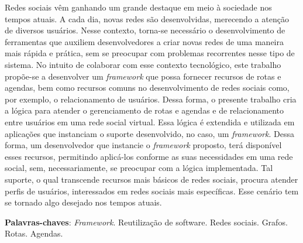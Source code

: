 \begin{resumo}

Redes sociais vêm ganhando um grande destaque em meio à sociedade nos tempos atuais. A cada dia, novas redes são desenvolvidas, merecendo a atenção de diversos usuários. Nesse contexto, torna-se necessário o desenvolvimento de ferramentas que auxiliem desenvolvedores a criar novas redes de uma maneira mais rápida e prática, sem se preocupar com problemas recorrentes nesse tipo de sistema. No intuito de colaborar com esse contexto tecnológico, este trabalho propõe-se a desenvolver um \textit{framework} que possa fornecer recursos de rotas e agendas, bem como recursos comuns no desenvolvimento de redes sociais como, por exemplo, o relacionamento de usuários. Dessa forma, o presente trabalho cria a lógica para atender o gerenciamento de rotas e agendas e de relacionamento entre usuários em uma rede social virtual. Essa lógica é extendida e utilizada em aplicações que instanciam o suporte desenvolvido, no caso, um \textit{framework}. Dessa forma, um desenvolvedor que instancie o \textit{framework} proposto, terá disponível esses recursos, permitindo aplicá-los conforme as suas necessidades em uma rede social, sem, necessariamente, se preocupar com a lógica implementada. Tal suporte, o qual transcende recursos mais básicos de redes sociais, procura atender perfis de usuários, interessados em redes sociais mais específicas. Esse cenário tem se tornado algo desejado nos tempos atuais.

 \vspace{\onelineskip}
    
 \noindent
 \textbf{Palavras-chaves}: \textit{Framework}. Reutilização de software. Redes sociais. Grafos. Rotas. Agendas.
\end{resumo}
